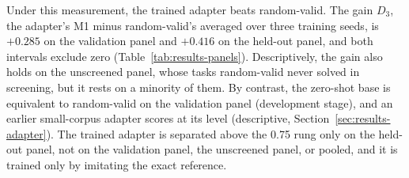 Under this measurement, the trained adapter beats random-valid.
The gain $D_3$, the adapter's M1 minus random-valid's averaged over three training seeds, is $+0.285$ on the validation panel and $+0.416$ on the held-out panel, and both intervals exclude zero (Table~\ref{tab:results-panels}).
Descriptively, the gain also holds on the unscreened panel, whose tasks random-valid never solved in screening, but it rests on a minority of them.
By contrast, the zero-shot base is equivalent to random-valid on the validation panel (development stage), and an earlier small-corpus adapter scores at its level (descriptive, Section~\ref{sec:results-adapter}).
The trained adapter is separated above the 0.75 rung only on the held-out panel, not on the validation panel, the unscreened panel, or pooled, and it is trained only by imitating the exact reference.

